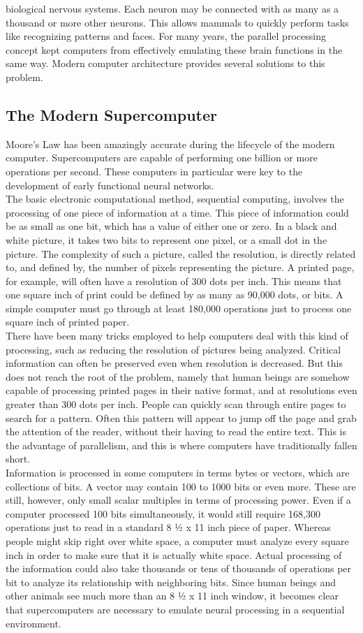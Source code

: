 biological nervous systems. Each neuron may be connected with as many
as a thousand or more other neurons. This allows mammals to quickly perform tasks like recognizing patterns and faces. For many years, the parallel processing concept kept
computers from effectively emulating these brain functions in the same way. Modern
computer architecture provides several solutions to this problem.
\subsection{The Modern Supercomputer}
Moore’s Law has been amazingly accurate during the lifecycle of the modern
computer. Supercomputers are capable of performing one billion or more operations per
second. These computers in particular were key to the development of early functional
neural networks.\\
The basic electronic computational method, sequential computing, involves the
processing of one piece of information at a time. This piece of information could be as
small as one bit, which has a value of either one or zero. In a black and white picture, it
takes two bits to represent one pixel, or a small dot in the picture. The complexity of
such a picture, called the resolution, is directly related to, and defined by, the number of
pixels representing the picture. A printed page, for example, will often have a resolution
of 300 dots per inch. This means that one square inch of print could be defined by as
many as 90,000 dots, or bits. A simple computer must go through at least 180,000
operations just to process one square inch of printed paper.\\
There have been many tricks employed to help computers deal with this kind of
processing, such as reducing the resolution of pictures being analyzed. Critical
information can often be preserved even when resolution is decreased. But this does not
reach the root of the problem, namely that human beings are somehow capable of
processing printed pages in their native format, and at resolutions even greater than 300
dots per inch. People can quickly scan through entire pages to search for a pattern. Often this pattern will appear to jump off the page and grab the attention of the reader, without
their having to read the entire text. This is the advantage of parallelism, and this is where
computers have traditionally fallen short.\\
Information is processed in some computers in terms bytes or vectors, which are
collections of bits. A vector may contain 100 to 1000 bits or even more. These are still,
however, only small scalar multiples in terms of processing power. Even if a computer
processed 100 bits simultaneously, it would still require 168,300 operations just to read in
a standard 8 ½ x 11 inch piece of paper. Whereas people might skip right over white
space, a computer must analyze every square inch in order to make sure that it is actually
white space. Actual processing of the information could also take thousands or tens of
thousands of operations per bit to analyze its relationship with neighboring bits. Since
human beings and other animals see much more than an 8 ½ x 11 inch window, it
becomes clear that supercomputers are necessary to emulate neural processing in a
sequential environment.
